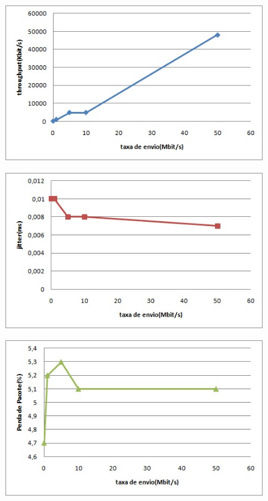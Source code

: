 \documentclass[12pt]{article}
\begin{document}
\begin{figure}[ht]
\centering
\includegraphics[scale=0.7]{4thr.jpg}
\caption{}
\label{4thr}
\end{figure}

\begin{figure}[ht]
\centering
\includegraphics[scale=0.7]{4jit.jpg}
\caption{}
\label{4jit}
\end{figure}

\begin{figure}[ht]
\centering
\includegraphics[scale=0.7]{4perda.jpg}
\caption{}
\label{4perda}
\end{figure}
\end{document}
